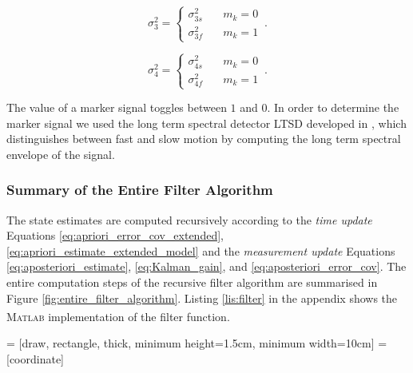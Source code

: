 \begin{equation}
  \sigma^2_3 = \begin{cases}
  	\sigma^2_{3s} & \quad m_k = 0 \\
  	\sigma^2_{3f} & \quad m_k = 1
  \end{cases}\,.
\end{equation}

\begin{equation}
  \sigma^2_4 = \begin{cases}
  	\sigma^2_{4s} & \quad m_k = 0 \\
  	\sigma^2_{4f} & \quad m_k = 1
  \end{cases}\,.
\end{equation}

\noindent
The value of a marker signal toggles between $1$ and $0$. In order to determine the marker signal we used the long term spectral detector \gls{LTSD} developed in \cite{olivares_vicente_gaitwatch_2013}, which distinguishes between fast and slow motion by computing the long term spectral envelope of the signal.

\subsubsection{Summary of the Entire Filter Algorithm}

The state estimates are computed recursively according to the \emph{time update} Equations \ref{eq:apriori_error_cov_extended}, \ref{eq:apriori_estimate_extended_model} and the \emph{measurement update} Equations \ref{eq:aposteriori_estimate}, \ref{eq:Kalman_gain}, and \ref{eq:aposteriori_error_cov}. The entire computation steps of the recursive filter algorithm are summarised in Figure \ref{fig:entire_filter_algorithm}. Listing \ref{lis:filter} in the appendix shows the \textsc{Matlab}\textsuperscript{\textregistered} implementation of the filter function.

 = [draw, rectangle, thick, 
    minimum height=1.5cm, minimum width=10cm]
 = [coordinate]

